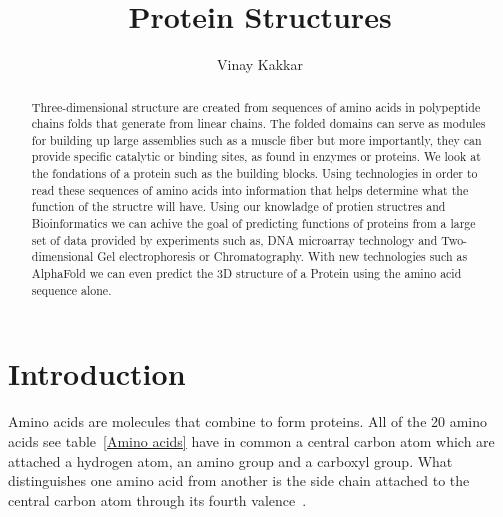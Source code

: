 \documentclass{report}
\title{Protein Structures}
\author{Vinay Kakkar}
\begin{document}
\maketitle

\tableofcontents

\begin{abstract}

Three-dimensional structure are created from sequences of amino acids in polypeptide chains folds that generate from linear chains. The folded domains can serve as modules for building up large assemblies such as a muscle fiber but more importantly, they can provide specific catalytic or binding sites, as found in enzymes or proteins. We look at the fondations of a protein such as the building blocks. Using technologies in order to read these sequences of amino acids into information that helps determine what the function of the structre will have. Using our knowladge of protien structres and Bioinformatics we can achive the goal of predicting functions of proteins from a large set of data provided by experiments such as, DNA microarray technology and Two-dimensional Gel electrophoresis or Chromatography. With new technologies such as AlphaFold we can even predict the 3D structure of a Protein using the amino acid sequence alone.

\end{abstract}

\renewcommand\thesection{\arabic{section}}

\section{Introduction}
Amino acids are molecules that combine to form proteins. All of the 20 amino acids see table~\ref{Amino acids} have in common a central carbon atom which are attached a hydrogen atom, an amino group and a carboxyl group. What distinguishes one amino acid from
another is the side chain attached to the central carbon atom through its fourth valence~\cite{branden_introduction_1998}.
\end{document}
